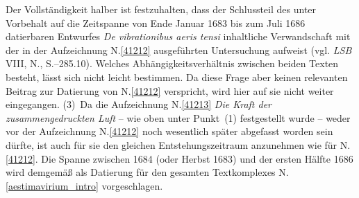 \pend%
\pstart%
Der Vollständigkeit halber ist festzuhalten, dass der Schlussteil des unter Vorbehalt auf die Zeitspanne von Ende Januar 1683 bis zum Juli 1686 datierbaren Entwurfes \textit{De vibrationibus aeris tensi} inhaltliche Verwandschaft mit der in der Aufzeichnung N.\;\ref{41212} ausgeführten Untersuchung aufweist (vgl. \textit{LSB} VIII, N.,\cite{01440} S.--285.10).
Welches Abhängigkeitsverhältnis zwischen beiden Texten besteht, lässt sich nicht leicht bestimmen.
Da diese Frage aber keinen relevanten Beitrag zur Datierung von N.\;\ref{41212} verspricht, wird hier auf sie nicht weiter eingegangen.
\pend%
\pstart%
(3)~Da die Aufzeichnung N.\;\ref{41213} \textit{Die Kraft der zusammengedruckten Luft} -- wie oben unter Punkt~(1) festgestellt wurde -- weder vor der Aufzeichnung N.\;\ref{41212} noch wesentlich später abgefasst worden sein dürfte, ist auch für sie den gleichen Entstehungszeitraum anzunehmen wie für N.\;\ref{41212}.
Die Spanne zwischen 1684 (oder Herbst 1683) und der ersten Hälfte 1686 wird demgemäß als Datierung für den gesamten Textkomplexes N.\;\ref{aestimavirium_intro} vorgeschlagen.
\pend%
\vspace{4.0em}%
%
\frenchspacing%
\normalsize%
